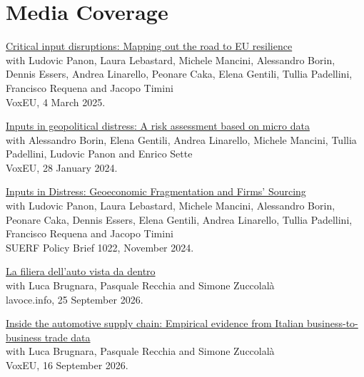 \documentclass[11pt,a4paper]{article}
\begin{document}
\section*{Media Coverage}
\noindent\begin{minipage}{\linewidth}
\href{https://cepr.org/voxeu/columns/critical-input-disruptions-mapping-out-road-eu-resilience}{Critical input disruptions: Mapping out the road to EU resilience}\\
with Ludovic Panon, Laura Lebastard, Michele Mancini, Alessandro Borin, Dennis Essers, Andrea Linarello, Peonare Caka, Elena Gentili, Tullia Padellini, Francisco Requena and Jacopo Timini\\
VoxEU, 4 March 2025.
\end{minipage}\par\medskip
\noindent\begin{minipage}{\linewidth}
\href{https://cepr.org/voxeu/columns/inputs-geopolitical-distress-risk-assessment-based-micro-data}{Inputs in geopolitical distress: A risk assessment based on micro data}\\
with Alessandro Borin, Elena Gentili, Andrea Linarello, Michele Mancini, Tullia Padellini, Ludovic Panon and Enrico Sette\\
VoxEU, 28 January 2024.
\end{minipage}\par\medskip
\noindent\begin{minipage}{\linewidth}
\href{https://www.suerf.org/publications/suerf-policy-notes-and-briefs/inputs-in-distress-geoeconomic-fragmentation-and-firms-sourcing/}{Inputs in Distress: Geoeconomic Fragmentation and Firms' Sourcing}\\
with Ludovic Panon, Laura Lebastard, Michele Mancini, Alessandro Borin, Peonare Caka, Dennis Essers, Elena Gentili, Andrea Linarello, Tullia Padellini, Francisco Requena and Jacopo Timini\\
SUERF Policy Brief 1022, November 2024.
\end{minipage}\par\medskip
\noindent\begin{minipage}{\linewidth}
\href{https://lavoce.info/archives/112861/la-filiera-dellauto-vista-da-dentro/}{La filiera dell'auto vista da dentro}\\
with Luca Brugnara, Pasquale Recchia and Simone Zuccolalà\\
lavoce.info, 25 September 2026.
\end{minipage}\par\medskip
\noindent\begin{minipage}{\linewidth}
\href{https://cepr.org/voxeu/columns/inside-automotive-supply-chain-empirical-evidence-italian-business-business-trade}{Inside the automotive supply chain: Empirical evidence from Italian business-to-business trade data}\\
with Luca Brugnara, Pasquale Recchia and Simone Zuccolalà\\
VoxEU, 16 September 2026.
\end{minipage}\par\medskip
\end{document}
